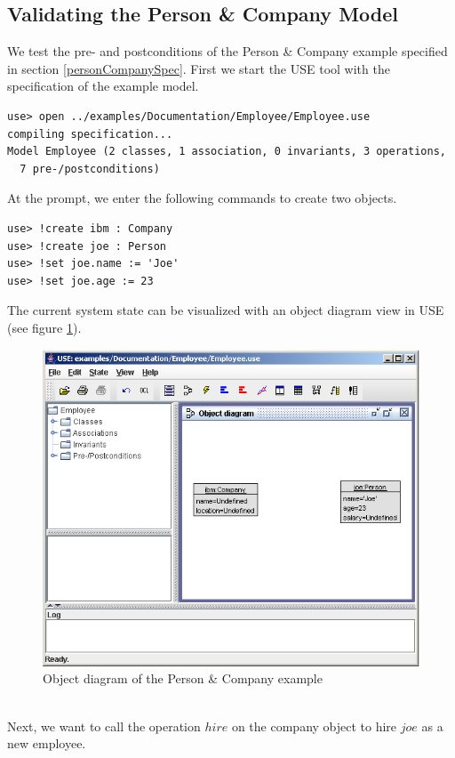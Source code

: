 \documentclass[a4paper,titlepage,oneside,final]{scrreprt} %
\begin{document}
\subsection{Validating the Person \& Company Model}
We test the pre- and postconditions of the Person \& Company example
specified in section \ref{personCompanySpec}. First we
start the USE tool with the specification of the example model.
\begin{verbatim}
use> open ../examples/Documentation/Employee/Employee.use
compiling specification...
Model Employee (2 classes, 1 association, 0 invariants, 3 operations,
  7 pre-/postconditions)
\end{verbatim}
At the prompt, we enter the following commands to create two objects.
\begin{verbatim}
use> !create ibm : Company
use> !create joe : Person
use> !set joe.name := 'Joe'
use> !set joe.age := 23
\end{verbatim}
The current system state can be visualized with an
object diagram view in USE (see figure \ref{fig:EmployeeObjects}).\\
\begin{figure}[ht]
\centering
\includegraphics[scale=0.7]{Screenshots/GUI/EmployeeObjects.png}
\caption{Object diagram of the Person \& Company example}
\label{fig:EmployeeObjects}
\end{figure}\\
Next, we want to call the operation $\mathit{hire}$ on the company object to hire
$\mathit{joe}$ as a new employee.
\end{document}
